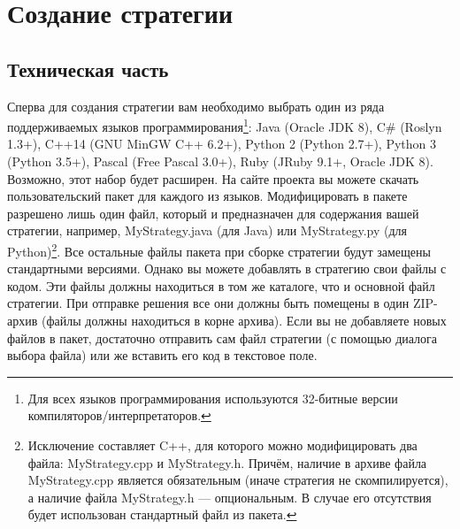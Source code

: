 \chapter{Создание стратегии}

\section{Техническая часть}

Сперва для создания стратегии вам необходимо выбрать один из ряда поддерживаемых языков программирования\footnote[14]{Для всех языков
программирования используются 32-битные версии компиляторов/интерпретаторов.}: Java (Oracle JDK 8), C\# (Roslyn 1.3+), C++14 (GNU MinGW C++
6.2+), Python 2 (Python 2.7+), Python 3 (Python 3.5+), Pascal (Free Pascal 3.0+), Ruby (JRuby 9.1+, Oracle JDK 8). Возможно, этот набор
будет расширен. На сайте проекта вы можете скачать пользовательский пакет для каждого из языков. Модифицировать в пакете разрешено лишь один
файл, который и предназначен для содержания вашей стратегии, например, MyStrategy.java (для Java) или MyStrategy.py (для
Python)\footnote[15]{Исключение составляет C++, для которого можно модифицировать два файла: MyStrategy.cpp и MyStrategy.h. Причём, наличие
в архиве файла MyStrategy.cpp является обязательным (иначе стратегия не скомпилируется), а наличие файла MyStrategy.h --- опциональным. В
случае его отсутствия будет использован стандартный файл из пакета.}. Все остальные файлы пакета при сборке стратегии будут замещены
стандартными версиями. Однако вы можете добавлять в стратегию свои файлы с кодом. Эти файлы должны находиться в том же каталоге, что и
основной файл стратегии. При отправке решения все они должны быть помещены в один ZIP-архив (файлы должны находиться в корне архива). Если
вы не добавляете новых файлов в пакет, достаточно отправить сам файл стратегии (с помощью диалога выбора файла) или же вставить его код в
текстовое поле.

